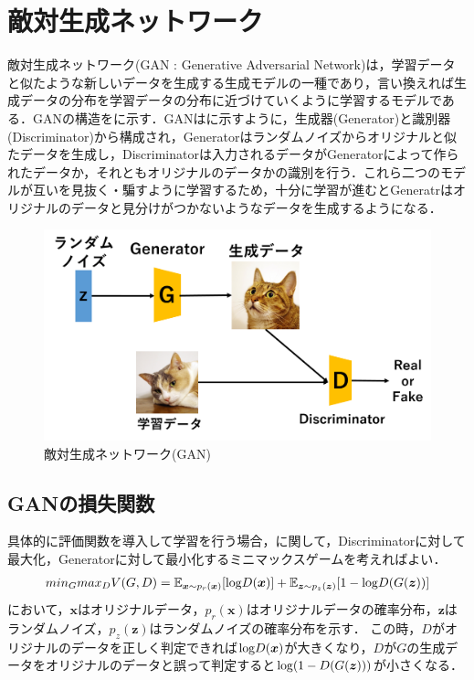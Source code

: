 \section{敵対生成ネットワーク}
敵対生成ネットワーク(GAN : Generative Adversarial Network)は，学習データと似たような新しいデータを生成する生成モデルの一種であり，言い換えれば生成データの分布を学習データの分布に近づけていくように学習するモデルである．GANの構造をに示す．GANはに示すように，生成器(Generator)と識別器(Discriminator)から構成され，Generatorはランダムノイズからオリジナルと似たデータを生成し，Discriminatorは入力されるデータがGeneratorによって作られたデータか，それともオリジナルのデータかの識別を行う．これら二つのモデルが互いを見抜く・騙すように学習するため，十分に学習が進むとGeneratrはオリジナルのデータと見分けがつかないようなデータを生成するようになる．\\
\begin{figure}[htbp]
	\begin{center}
		\includegraphics[scale=0.6]{./images/deeplearning/GAN.png}
		\caption{敵対生成ネットワーク(GAN)}
		\label{fig:GAN}
	\end{center}
\end{figure}

\newpage
\subsection{GANの損失関数}
具体的に評価関数を導入して学習を行う場合，に関して，Discriminatorに対して最大化，Generatorに対して最小化するミニマックスゲームを考えればよい\cite{GAN}．
\begin{eqnarray}
	min_G max_DV(G, D) = \mathbb E_{\bm x \sim p_r(\bm x)}[{\rm log}D(\bm x)] + \mathbb E_{\bm z \sim p_z(\bm z)}[1 - {\rm log}D(G(\bm z))] \label{eq:minimax}
\end{eqnarray}
において，$\bm x$はオリジナルデータ，$p_r(\bm x)$はオリジナルデータの確率分布，$\bm z$はランダムノイズ，$p_z(\bm z)$はランダムノイズの確率分布を示す．
この時，$D$がオリジナルのデータを正しく判定できれば${\rm log}D(\bm x)$が大きくなり，$D$が$G$の生成データをオリジナルのデータと誤って判定すると${\rm log}(1-D(G(\bm z)))$が小さくなる．

